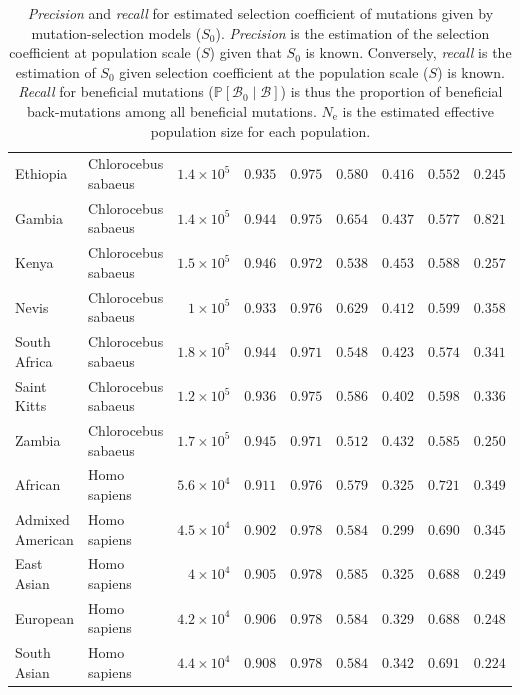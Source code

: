 \documentclass[9pt,twocolumn,twoside,lineno]{pnas-new}
\newcommand{\Ne}{N_{\text{e}}}
\newcommand{\proba}{\mathbb{P}}
\newcommand{\Sphy}{S_{0}}
\newcommand{\SphyBen}{\mathcal{B}_0}
\newcommand{\given}{\mid}
\newcommand{\Spop}{S}
\newcommand{\SpopBen}{\mathcal{B}}
\begin{document}
\begin{table}[tb]
\begin{adjustbox}{width=17.8cm}
\begin{tabular}{||l|l|r||r|r||r|r||r|r||}
                     \rowcolor{LIGHTGREY} Ethiopia & Chlorocebus sabaeus & $1.4\times 10^{5}$ & $ 0.935$ & $ 0.975$ & $ 0.580$ & $ 0.416$ & $ 0.552$ & $ 0.245$ \\
                     \rowcolor{LIGHTGREY} Gambia & Chlorocebus sabaeus & $1.4\times 10^{5}$ & $ 0.944$ & $ 0.975$ & $ 0.654$ & $ 0.437$ & $ 0.577$ & $ 0.821$ \\
                     \rowcolor{LIGHTGREY} Kenya & Chlorocebus sabaeus & $1.5\times 10^{5}$ & $ 0.946$ & $ 0.972$ & $ 0.538$ & $ 0.453$ & $ 0.588$ & $ 0.257$ \\
                     \rowcolor{LIGHTGREY} Nevis & Chlorocebus sabaeus & $ 1\times 10^{5}$ & $ 0.933$ & $ 0.976$ & $ 0.629$ & $ 0.412$ & $ 0.599$ & $ 0.358$ \\
                     \rowcolor{LIGHTGREY} South Africa & Chlorocebus sabaeus & $1.8\times 10^{5}$ & $ 0.944$ & $ 0.971$ & $ 0.548$ & $ 0.423$ & $ 0.574$ & $ 0.341$ \\
                     \rowcolor{LIGHTGREY} Saint Kitts & Chlorocebus sabaeus & $1.2\times 10^{5}$ & $ 0.936$ & $ 0.975$ & $ 0.586$ & $ 0.402$ & $ 0.598$ & $ 0.336$ \\
                     \rowcolor{LIGHTGREY} Zambia & Chlorocebus sabaeus & $1.7\times 10^{5}$ & $ 0.945$ & $ 0.971$ & $ 0.512$ & $ 0.432$ & $ 0.585$ & $ 0.250$ \\
                     African & Homo sapiens & $5.6\times 10^{4}$ & $ 0.911$ & $ 0.976$ & $ 0.579$ & $ 0.325$ & $ 0.721$ & $ 0.349$ \\
                     Admixed American & Homo sapiens & $4.5\times 10^{4}$ & $ 0.902$ & $ 0.978$ & $ 0.584$ & $ 0.299$ & $ 0.690$ & $ 0.345$ \\
                     East Asian & Homo sapiens & $ 4\times 10^{4}$ & $ 0.905$ & $ 0.978$ & $ 0.585$ & $ 0.325$ & $ 0.688$ & $ 0.249$ \\
                     European & Homo sapiens & $4.2\times 10^{4}$ & $ 0.906$ & $ 0.978$ & $ 0.584$ & $ 0.329$ & $ 0.688$ & $ 0.248$ \\
                     South Asian & Homo sapiens & $4.4\times 10^{4}$ & $ 0.908$ & $ 0.978$ & $ 0.584$ & $ 0.342$ & $ 0.691$ & $ 0.224$ \\
                     \bottomrule
              \end{tabular}
       \end{adjustbox}
       \caption{
              \textit{Precision} and \textit{recall} for estimated selection coefficient of mutations given by mutation-selection models ($\Sphy$).
              \textit{Precision} is the estimation of the selection coefficient at population scale ($\Spop$) given that $\Sphy$ is known.
              Conversely, \textit{recall} is the estimation of $\Sphy$ given selection coefficient at the population scale ($\Spop$) is known.
              \textit{Recall} for beneficial mutations ($\proba [\SphyBen \given \SpopBen]$) is thus the proportion of beneficial back-mutations among all beneficial mutations.
              $\Ne$ is the estimated effective population size for each population.
       }
       \label{table:proba}
\end{table}
\end{document}
